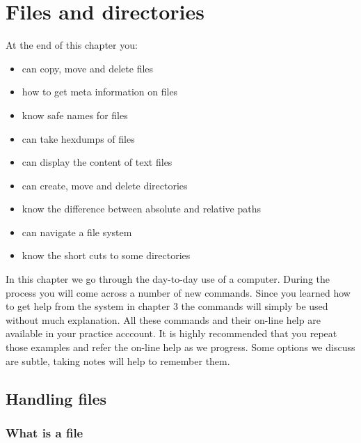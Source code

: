 \documentclass[11pt,a4paper,twoside]{article}
\begin{document}
\newpage

\section{Files and directories}

At the end of this chapter you:
\begin{itemize}
\item can copy, move and delete files

\item how to get meta information on files

\item know safe names for files

\item can take hexdumps of files

\item can display the content of text files

\item can create, move and delete directories

\item know the difference between absolute and relative paths

\item can navigate a file system

\item know the short cuts to some directories

\end{itemize}

In this chapter we go through the day-to-day use of a computer. During the
process you will come across a number of new commands. Since you learned
how to get help from the system in chapter 3 the commands will simply be 
used without much explanation. All these commands and their on-line help 
are available in your practice acccount. It is highly recommended that you 
repeat those examples and refer the on-line help as we progress. Some 
options we discuss are subtle, taking notes will help to remember them.


\subsection{Handling files}

\subsubsection{What is a file}
\end{document}
